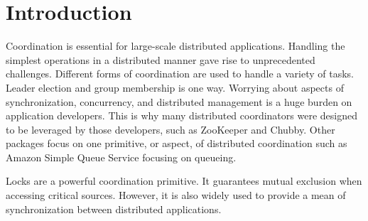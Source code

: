 \section{Introduction}\label{sec:intro}

Coordination is essential for large-scale distributed applications. Handling the simplest operations in a distributed manner gave rise to unprecedented challenges. Different forms of coordination are used to handle a variety of tasks. Leader election and group membership is one way. Worrying about aspects of synchronization, concurrency, and distributed management is a huge burden on application developers. This is why many distributed coordinators were designed to be leveraged by those developers, such as ZooKeeper and Chubby. Other packages focus on one primitive, or aspect, of distributed coordination such as Amazon Simple Queue Service focusing on queueing.

Locks are a powerful coordination primitive. It guarantees mutual exclusion when accessing critical sources. However, it is also widely used to provide a mean of synchronization between distributed applications. 
